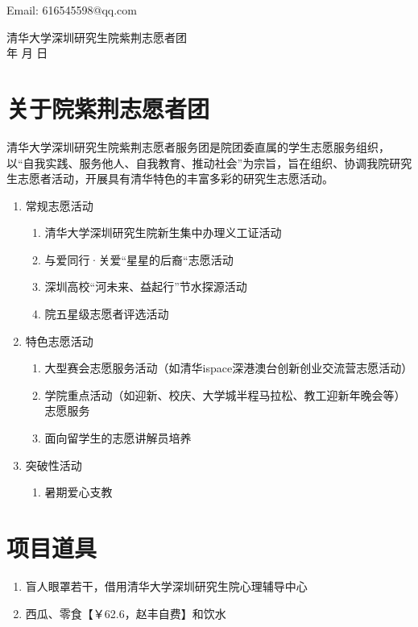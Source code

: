 \documentclass[12pt]{ctexart}
\begin{document}
Email: 616545598@qq.com
\begin{flushright}
清华大学深圳研究生院紫荆志愿者团\\
\the\year 年 \the\month 月 \the\day 日
\end{flushright}
\begin{appendix}
\section{关于院紫荆志愿者团}
清华大学深圳研究生院紫荆志愿者服务团是院团委直属的学生志愿服务组织，以“自我实践、服务他人、自我教育、推动社会”为宗旨，旨在组织、协调我院研究生志愿者活动，开展具有清华特色的丰富多彩的研究生志愿活动。
\begin{enumerate}[label = {\chinese*、}]
\item 常规志愿活动
\begin{enumerate}[label =(\arabic*)]
         \item  清华大学深圳研究生院新生集中办理义工证活动
         \item 与爱同行·关爱“星星的后裔“志愿活动
         \item  深圳高校“河未来、益起行”节水探源活动
         \item 院五星级志愿者评选活动
\end{enumerate}
\item 特色志愿活动
\begin{enumerate}[label =(\arabic*)]
        \item 大型赛会志愿服务活动（如清华ispace深港澳台创新创业交流营志愿活动）
        \item 学院重点活动（如迎新、校庆、大学城半程马拉松、教工迎新年晚会等）志愿服务
        \item 面向留学生的志愿讲解员培养
\end{enumerate}
\item 突破性活动
\begin{enumerate}[label =(\arabic*)]
         \item 暑期爱心支教
\end{enumerate}
\end{enumerate}
\section{项目道具}\label{scheduling}
\begin{enumerate}
\item 盲人眼罩若干，借用清华大学深圳研究生院心理辅导中心
\item 西瓜、零食【￥62.6，赵丰自费】和饮水
\end{enumerate}

\end{appendix}
\end{document}
